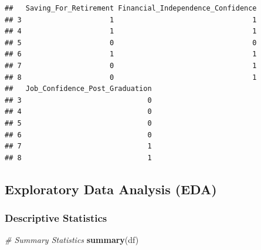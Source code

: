 \documentclass[
]{article}
\newenvironment{Shaded}{\begin{snugshade}}{\end{snugshade}}
\newcommand{\CommentTok}[1]{\textcolor[rgb]{0.56,0.35,0.01}{\textit{#1}}}
\newcommand{\FunctionTok}[1]{\textcolor[rgb]{0.13,0.29,0.53}{\textbf{#1}}}
\newcommand{\NormalTok}[1]{#1}
\begin{document}
\begin{verbatim}
##   Saving_For_Retirement Financial_Independence_Confidence
## 3                     1                                 1
## 4                     1                                 1
## 5                     0                                 0
## 6                     1                                 1
## 7                     0                                 1
## 8                     0                                 1
##   Job_Confidence_Post_Graduation
## 3                              0
## 4                              0
## 5                              0
## 6                              0
## 7                              1
## 8                              1
\end{verbatim}

\subsection{Exploratory Data Analysis
(EDA)}\label{exploratory-data-analysis-eda}

\subsubsection{Descriptive Statistics}\label{descriptive-statistics}

\begin{Shaded}
\begin{Highlighting}[]
\CommentTok{\# Summary Statistics}
\FunctionTok{summary}\NormalTok{(df)}
\end{Highlighting}
\end{Shaded}
\end{document}
